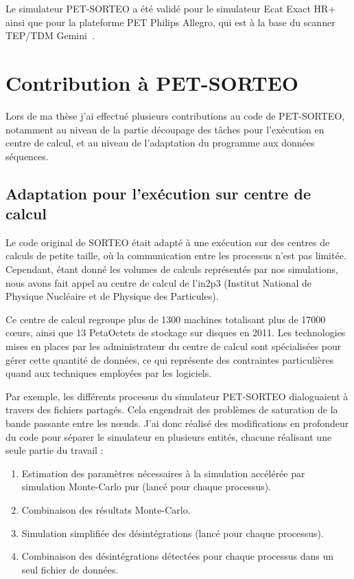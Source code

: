 Le simulateur PET-SORTEO a été validé pour le simulateur Ecat Exact HR+~\cite{reilhac2004pet} ainsi que pour la plateforme PET Philips Allegro, qui est à la base du scanner TEP/TDM Gemini~\cite{lemaitre2008}. 


	\section{Contribution à PET-SORTEO}

Lors de ma thèse j'ai effectué plusieurs contributions au code de PET-SORTEO, notamment au niveau de la partie découpage des tâches pour l'exécution en centre de calcul, et au niveau de l'adaptation du programme aux données séquences.

\subsection{Adaptation pour l'exécution sur centre de calcul}

Le code original de SORTEO était adapté à une exécution sur des centres de calculs de petite taille, où la communication entre les processus n’est pas limitée. Cependant, étant donné les volumes de calculs représentés par nos simulations, nous avons fait appel au centre de calcul de l'in2p3 (Institut National de Physique Nucléaire et de Physique des Particules).

Ce centre de calcul regroupe plus de 1300 machines totalisant plus de 17000 cœurs, ainsi que 13 PetaOctets de stockage sur disques en 2011. Les technologies mises en places par les administrateur du centre de calcul sont spécialisées pour gérer cette quantité de données, ce qui représente des contraintes particulières quand aux techniques employées par les logiciels.

Par exemple, les différents processus du simulateur PET-SORTEO dialoguaient à travers des fichiers partagés. Cela engendrait des problèmes de saturation de la bande passante entre les nœuds. J'ai donc réalisé des modifications en profondeur du code pour séparer le simulateur en plusieurs entités, chacune réalisant une seule partie du travail :

    \begin{enumerate}
        \item Estimation des paramètres nécessaires à la simulation accélérée par simulation Monte-Carlo pur (lancé pour chaque processus).
        \item Combinaison des résultats Monte-Carlo.
        \item Simulation simplifiée des désintégrations (lancé pour chaque processus).
        \item Combinaison des désintégrations détectées pour chaque processus dans un seul fichier de données.
    \end{enumerate}

